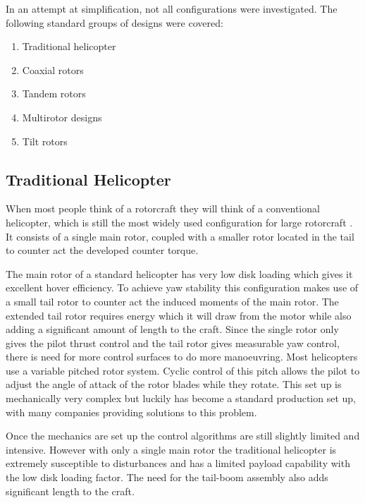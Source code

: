 \documentclass[a4paper, 10pt, conference]{ieeeconf}
\begin{document}
In an attempt at simplification, not all configurations were investigated. The following standard groups of designs were covered:

\begin{enumerate}
\item Traditional helicopter
\item Coaxial rotors
\item Tandem rotors
\item Multirotor designs
\item Tilt rotors 
\end{enumerate}

\subsection{Traditional Helicopter}
When most people think of a rotorcraft they will think of a conventional helicopter, which is still the most widely used configuration for large rotorcraft \cite{RotorConfig}. It consists of a single main rotor, coupled with a smaller rotor located in the tail to counter act the developed counter torque.

The main rotor of a standard helicopter has very low disk loading which gives it excellent hover efficiency. To achieve yaw stability this configuration makes use of a small tail rotor to counter act the induced moments of the main rotor. The extended tail rotor requires energy which it will draw from the motor while also adding a significant amount of length to the craft. Since the single rotor only gives the pilot thrust control and the tail rotor gives measurable yaw control, there is need for more control surfaces to do more manoeuvring. Most helicopters use a variable pitched rotor system. Cyclic control of this pitch allows the pilot to adjust the angle of attack of the rotor blades while they rotate. This set up is mechanically very complex but luckily has become a standard production set up, with many companies providing solutions to this problem. 

Once the mechanics are set up the control algorithms are still slightly limited and intensive. However with only a single main rotor the traditional helicopter is extremely susceptible to disturbances and has a limited payload capability with the low disk loading factor. The need for the tail-boom assembly also adds significant length to the craft.
\end{document}
